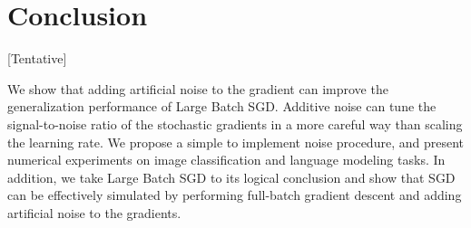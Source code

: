 \documentclass{article} %
\begin{document}
\section{Conclusion}
[Tentative]

We show that adding artificial noise to the gradient can improve the generalization performance of Large Batch SGD.
Additive noise can tune the signal-to-noise ratio of the stochastic gradients in a more careful way than scaling the learning rate.
We propose a simple to implement noise procedure, and present numerical experiments on image classification and language modeling tasks.
In addition, we take Large Batch SGD to its logical conclusion and show that SGD can be effectively simulated by performing full-batch gradient descent and adding artificial noise to the gradients.


\end{document}
